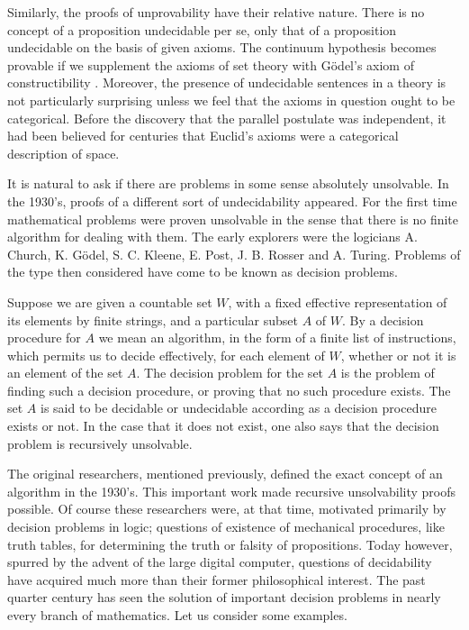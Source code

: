 \documentclass[11pt]{article}
\begin{document}
Similarly, the proofs of unprovability have their relative nature. There is no concept of a proposition undecidable per se, only that of a proposition undecidable on the basis of given axioms. The continuum hypothesis becomes provable if we supplement the axioms of set theory with Gödel's axiom of constructibility \cite{r12}. Moreover, the presence of undecidable sentences in a theory is not particularly surprising unless we feel that the axioms in question ought to be categorical. Before the discovery that the parallel postulate was independent, it had been believed for centuries that Euclid's axioms were a categorical description of space.

It is natural to ask if there are problems in some sense absolutely unsolvable.
In the 1930's, proofs of a different sort of undecidability appeared. For the first time mathematical problems were proven unsolvable in the sense that there is no finite algorithm for dealing with them. The early explorers were the logicians A. Church, K. Gödel, S. C. Kleene, E. Post, J. B. Rosser and A. Turing. Problems of the type then considered have come to be known as decision problems.

Suppose we are given a countable set $W$, with a fixed effective representation of its elements by finite strings, and a particular subset $A$ of $W$. By a decision procedure for $A$ we mean an algorithm, in the form of a finite list of instructions, which permits us to decide effectively, for each element of $W$, whether or not it is an element of the set $A$. The decision problem for the set $A$ is the problem of finding such a decision procedure, or proving that no such procedure exists. The set $A$ is said to be decidable or undecidable according as a decision procedure exists or not. In the case that it does not exist, one also says that the decision problem is recursively unsolvable.

The original researchers, mentioned previously, defined the exact concept of an algorithm in the 1930's. This important work made recursive unsolvability proofs possible. Of course these researchers were, at that time, motivated primarily by decision problems in logic; questions of existence of mechanical procedures, like truth tables, for determining the truth or falsity of propositions. Today however, spurred by the advent of the large digital computer, questions of decidability have acquired much more than their former philosophical interest. The past quarter century has seen the solution of important decision problems in nearly every branch of mathematics. Let us consider some examples.
\end{document}
